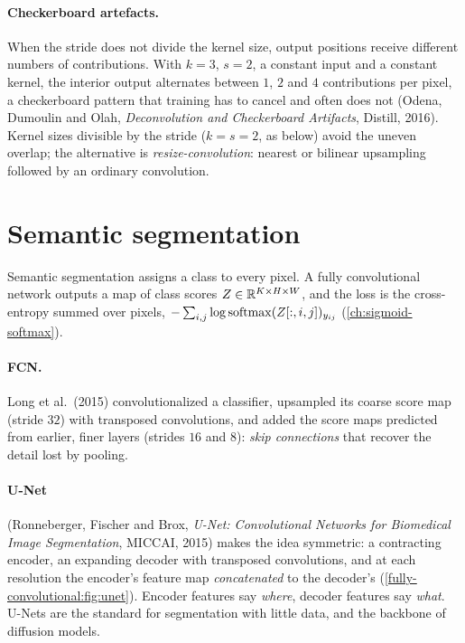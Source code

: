 \begin{notechapter}
\paragraph{Checkerboard artefacts.} When the stride does not divide the kernel size,
output positions receive different numbers of contributions. With $k = 3$, $s = 2$, a constant
input and a constant kernel, the interior output alternates between $1$, $2$ and $4$ contributions per
pixel, a checkerboard pattern that training has to cancel and often does not (Odena,
Dumoulin and Olah, \emph{Deconvolution and Checkerboard Artifacts}, Distill, 2016). Kernel
sizes divisible by the stride ($k = s = 2$, as below) avoid the uneven overlap; the alternative is
\emph{resize-convolution}: nearest or bilinear upsampling followed by an ordinary convolution.

\section{Semantic segmentation}\label{fully-convolutional:sec:segmentation}

Semantic segmentation assigns a class to every pixel. A fully convolutional network
outputs a map of class scores $Z\in\mathbb{R}^{K\times H\times W}$, and the loss is the cross-entropy summed over pixels,
$-\sum_{i,j}\log\operatorname{softmax}(Z[:,i,j])_{y_{ij}}$ (\cref{ch:sigmoid-softmax}).

\paragraph{FCN.} Long et al.\ (2015) convolutionalized a classifier, upsampled its coarse
score map (stride $32$) with transposed convolutions, and added the score maps predicted from
earlier, finer layers (strides $16$ and $8$): \emph{skip connections} that recover the detail lost by
pooling.

\paragraph{U-Net} (Ronneberger, Fischer and Brox, \emph{U-Net: Convolutional Networks for
Biomedical Image Segmentation}, MICCAI, 2015) makes the idea symmetric: a contracting
encoder, an expanding decoder with transposed convolutions, and at each resolution the
encoder's feature map \emph{concatenated} to the decoder's (\cref{fully-convolutional:fig:unet}). Encoder
features say \emph{where}, decoder features say \emph{what}. U-Nets are the standard for
segmentation with little data, and the backbone of diffusion models.


\end{notechapter}
